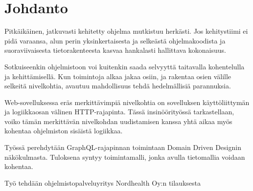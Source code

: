 \hypertarget{johdanto}{%
\chapter{Johdanto}\label{johdanto}}

Pitkäikäinen, jatkuvasti kehitetty ohjelma mutkistuu herkästi. Jos
kehitystiimi ei pidä varaansa, alun perin yksinkertaisesta ja selkeästä
ohjelmakoodista ja suoraviivaisesta tietorakenteesta kasvaa hankalasti
hallittava kokonaisuus.

Sotkuiseenkin ohjelmistoon voi kuitenkin saada selvyyttä taitavalla
kohentelulla ja kehittämisellä. Kun toimintoja alkaa jakaa osiin, ja
rakentaa osien välille selkeitä nivelkohtia, avautuu mahdollisuus tehdä
hedelmällisiä parannuksia.

Web-sovelluksessa eräs merkittävimpiä nivelkohtia on sovelluksen
käyttöliittymän ja logiikkaosan välinen HTTP-rajapinta. Tässä
insinöörityössä tarkastellaan, voiko tämän merkittävän nivelkohdan
uudistamisen kanssa yhtä aikaa myös kohentaa ohjelmiston sisäistä
logiikkaa.

Työssä perehdytään GraphQL-rajapinnan toimintaan Domain Driven Designin
näkökulmasta. Tuloksena syntyy toimintamalli, jonka avulla tietomallia
voidaan kohentaa.

Työ tehdään ohjelmistopalveluyritys Nordhealth Oy:n tilauksesta
